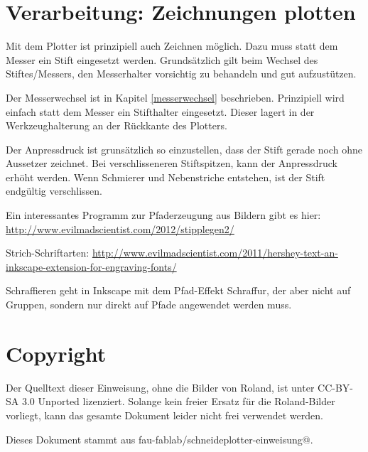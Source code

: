 \documentclass{\basedir/fablab-document}
\begin{document}
\section{Verarbeitung: Zeichnungen plotten}
Mit dem Plotter ist prinzipiell auch Zeichnen möglich.
Dazu muss statt dem Messer ein Stift eingesetzt werden.
Grundsätzlich gilt beim Wechsel des Stiftes/Messers, den Messerhalter vorsichtig zu behandeln und gut aufzustützen.

Der Messerwechsel ist in Kapitel \ref{messerwechsel} beschrieben.
Prinzipiell wird einfach statt dem Messer ein Stifthalter eingesetzt.
Dieser lagert in der Werkzeughalterung an der Rückkante des Plotters.

Der Anpressdruck ist grunsätzlich so einzustellen, dass der Stift gerade noch ohne Aussetzer zeichnet.
Bei verschlisseneren Stiftspitzen, kann der Anpressdruck erhöht werden.
Wenn Schmierer und Nebenstriche entstehen, ist der Stift endgültig verschlissen.


Ein interessantes Programm zur Pfaderzeugung aus Bildern gibt es hier: \url{http://www.evilmadscientist.com/2012/stipplegen2/}

Strich-Schriftarten: \url{http://www.evilmadscientist.com/2011/hershey-text-an-inkscape-extension-for-engraving-fonts/}

Schraffieren geht in Inkscape mit dem Pfad-Effekt Schraffur, der aber nicht auf Gruppen, sondern nur direkt auf Pfade angewendet werden muss.

\listoftodos

\newpage
\appendix
\section{Copyright}
Der Quelltext dieser Einweisung, ohne die Bilder von Roland, ist unter CC-BY-SA 3.0 Unported lizenziert. Solange kein freier Ersatz für die Roland-Bilder vorliegt, kann das gesamte Dokument leider nicht frei verwendet werden.

Dieses Dokument stammt aus fau-fablab/schneideplotter-einweisung@\Revision{}.
\end{document}
